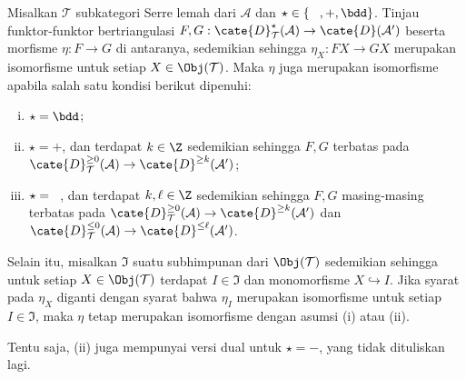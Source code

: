 \begin{proposisi}\label{prop:wayout}
	Misalkan $\mathcal{T}$ subkategori Serre lemah dari $\mathcal{A}$ dan
	$\star \in \{\hspace{0.8em}, +, \bdd\}$. Tinjau funktor-funktor
	bertriangulasi
	$F, G: \cate{D}^{\star}_{\mathcal{T}}(\mathcal{A}) \to
	\cate{D}(\mathcal{A}')$ beserta morfisme $\eta: F \to G$ di antaranya,
	sedemikian sehingga $\eta_X: FX \to GX$ merupakan isomorfisme untuk setiap
	$X \in \Obj(\mathcal{T})$. Maka $\eta$ juga merupakan isomorfisme apabila
	salah satu kondisi berikut dipenuhi:
	\begin{enumerate}[(i)]
		\item $\star = \bdd$;
		\item $\star = +$, dan terdapat $k \in \Z$ sedemikian sehingga $F,G$
		terbatas pada
		$\cate{D}^{\geq 0}_{\mathcal{T}}(\mathcal{A}) \to
		\cate{D}^{\geq k}(\mathcal{A}')$;
		\item $\star = \hspace{0.8em}$, dan terdapat $k, \ell \in \Z$
		sedemikian sehingga $F,G$ masing-masing terbatas pada
		$\cate{D}^{\geq 0}_{\mathcal{T}}(\mathcal{A}) \to
		\cate{D}^{\geq k}(\mathcal{A}')$ dan
		$\cate{D}^{\leq 0}_{\mathcal{T}}(\mathcal{A}) \to
		\cate{D}^{\leq \ell}(\mathcal{A}')$.
	\end{enumerate}

	Selain itu, misalkan $\mathfrak{I}$ suatu subhimpunan dari
	$\Obj(\mathcal{T})$ sedemikian sehingga untuk setiap
	$X \in \Obj(\mathcal{T})$ terdapat $I \in \mathfrak{I}$ dan monomorfisme
	$X \hookrightarrow I$. Jika syarat pada $\eta_X$ diganti dengan syarat bahwa
	$\eta_I$ merupakan isomorfisme untuk setiap $I \in \mathfrak{I}$, maka
	$\eta$ tetap merupakan isomorfisme dengan asumsi (i) atau (ii).
	
	Tentu saja, (ii) juga mempunyai versi dual untuk $\star = -$, yang tidak
	dituliskan lagi.
\end{proposisi}

